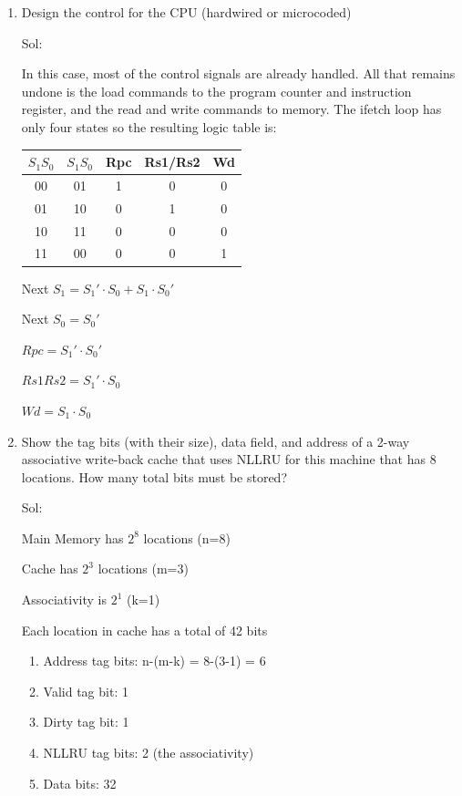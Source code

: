 \begin{enumerate}
    \item Design the control for the CPU (hardwired or microcoded)

    {\color{ans}
    Sol:

    In this case, most of the control signals are already handled.  All that remains undone is the load commands to the program counter and instruction register, and the read and write commands to memory.  The ifetch loop has only four states so the resulting logic table is:

\begin{tabular}{c||c|c|c|c}
$S_1 S_0$ & $S_1 S_0$ & Rpc & Rs1/Rs2 & Wd \\ \hline
00        & 01        & 1   & 0       & 0  \\
01        & 10        & 0   & 1       & 0  \\
10        & 11        & 0   & 0       & 0  \\
11        & 00        & 0   & 0       & 1  \\
\end{tabular}

Next $S_1 = S_1'\cdot S_0 + S_1\cdot S_0'$

Next $S_0 = S_0'$

$Rpc = S_1'\cdot S_0'$

$Rs1Rs2 = S_1'\cdot S_0$

$Wd = S_1\cdot S_0$
    }

    \item Show the tag bits (with their size), data field, and address of a 2-way associative write-back cache that uses NLLRU for this machine that has 8 locations.  How many total bits must be stored?

    {\color{ans}
    Sol:

    Main Memory has $2^8$ locations (n=8)

    Cache has $2^3$ locations (m=3)

    Associativity is $2^1$ (k=1)

    Each location in cache has a total of 42 bits
    \begin{enumerate}
        \item Address tag bits: n-(m-k) = 8-(3-1) = 6
        \item Valid tag bit: 1
        \item Dirty tag bit: 1
        \item NLLRU tag bits: 2 (the associativity)
        \item Data bits: 32
    \end{enumerate}

}
\end{enumerate}
